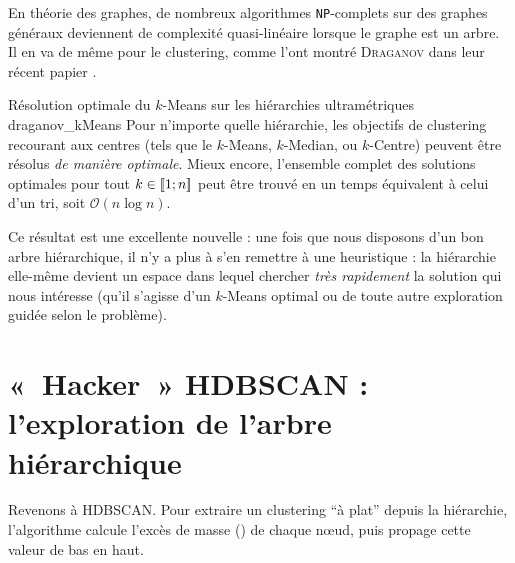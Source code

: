 En théorie des graphes, de nombreux algorithmes \texttt{NP}-complets sur des graphes généraux deviennent de complexité quasi-linéaire lorsque le graphe est un arbre. Il en va de même pour le clustering, comme l'ont montré \textsc{Draganov} \etal dans leur récent papier \cite{Draganov2025}.

\begin{Resultat}{Résolution optimale du $k$-Means sur les hiérarchies ultramétriques \cite{Draganov2025}}{draganov_kMeans}
Pour n'importe quelle hiérarchie, les objectifs de clustering recourant aux centres (tels que le $k$-Means, $k$-Median, ou $k$-Centre) peuvent être résolus \emph{de manière optimale}. Mieux encore, l'ensemble complet des solutions optimales pour tout $k \in \left[\!\left[ 1 ; n \right]\!\right]$ peut être trouvé en un temps équivalent à celui d'un tri, soit $\mathcal{O}(n \log n)$. %
\end{Resultat}

Ce résultat est une excellente nouvelle : une fois que nous disposons d'un bon arbre hiérarchique, il n'y a plus à s'en remettre à une heuristique : la hiérarchie elle-même devient un espace dans lequel chercher \emph{très rapidement} la solution qui nous intéresse (qu'il s'agisse d'un $k$-Means optimal ou de toute autre exploration guidée selon le problème).


\section{«~Hacker~» HDBSCAN : l'exploration de l'arbre hiérarchique}

Revenons à HDBSCAN. Pour extraire un clustering ``à plat'' depuis la hiérarchie, l'algorithme calcule l'excès de masse () de chaque nœud, puis propage cette valeur de bas en haut.


